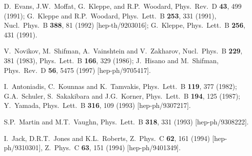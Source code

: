 \documentclass[11pt]{article}
\begin{document}
\begin{thebibliography}{999}
D.~Evans, J.W.~Moffat, G.~Kleppe, and R.P.~Woodard,
  Phys.\ Rev.\ D {\bf 43}, 499 (1991);
G.~Kleppe and R.P.~Woodard, 
  Phys.\ Lett.\ B {\bf 253}, 331 (1991),
  Nucl.\ Phys.\ B {\bf 388}, 81 (1992)
  [hep-th/9203016];
G.~Kleppe, 
  Phys.\ Lett.\ B {\bf 256}, 431 (1991).

V.~Novikov, M.~Shifman, A.~Vainshtein and V.~Zakharov, 
  Nucl.\ Phys.\ B {\bf 229}, 381 (1983),
  Phys.\ Lett.\ B {\bf 166}, 329 (1986);
J.~Hisano and M.~Shifman, 
  Phys.\ Rev.\ D {\bf 56}, 5475 (1997)
  [hep-ph/9705417].

I.~Antoniadis, C.~Kounnas and K.~Tamvakis,
  Phys.\ Lett.\ B {\bf 119}, 377 (1982);
G.A.~Schuler, S.~Sakakibara and J.G.~Korner,
  Phys.\ Lett.\ B {\bf 194}, 125 (1987);
Y.~Yamada,
  Phys.\ Lett.\ B {\bf 316}, 109 (1993)
  [hep-ph/9307217].

 S.P.~Martin and M.T.~Vaughn,
  Phys.\ Lett.\ B {\bf 318}, 331 (1993)
  [hep-ph/9308222].

 I.~Jack, D.R.T.~Jones and K.L.~Roberts,
  Z.\ Phys.\ C {\bf 62}, 161 (1994)
  [hep-ph/9310301],
  Z.\ Phys.\ C {\bf 63}, 151 (1994)
  [hep-ph/9401349].


\end{thebibliography}
\end{document}

